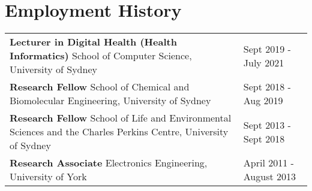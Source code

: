 \documentclass[a4paper]{article}
\begin{document}
\section*{Employment History}

\begin{tabular}{p{12cm}p{6cm}}


    \textbf{Lecturer in Digital Health (Health Informatics)}\newline
    School of Computer Science, University of Sydney
    \vspace{3mm}
    &
    Sept 2019 - July 2021\\

    \textbf{Research Fellow}\newline
    School of Chemical and Biomolecular Engineering, University of Sydney
    \vspace{3mm}
    &
    Sept 2018 - Aug 2019\\


    \textbf{Research Fellow} \newline
    School of Life and Environmental Sciences and the Charles Perkins Centre, University of Sydney
    \vspace{3mm}
    &
    Sept 2013 - Sept 2018 \\

    \textbf{Research Associate} \newline
    Electronics Engineering, University of York
    &
    April 2011 - August 2013\\[2mm]
\end{tabular}


\end{document}
